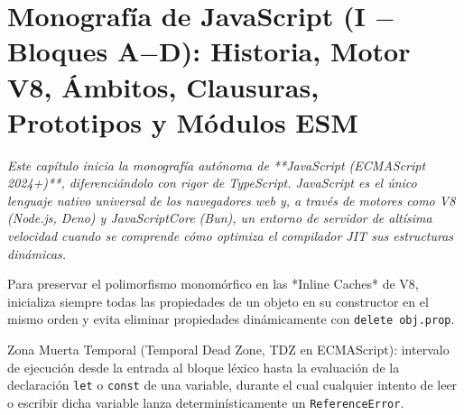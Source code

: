 \documentclass{book}
\begin{document}
\chapter{Monografía de JavaScript (I \(-\) Bloques A\(-\)D): Historia, Motor V8, Ámbitos, Clausuras, Prototipos y Módulos ESM}
\label{chap:cap04-javascript-fundamentos-closures-prototipos-nivel-intermedio}

\noindent\textit{Este capítulo inicia la monografía autónoma de **JavaScript (ECMAScript 2024+)**, diferenciándolo con rigor de TypeScript. JavaScript es el único lenguaje nativo universal de los navegadores web y, a través de motores como V8 (Node.js, Deno) y JavaScriptCore (Bun), un entorno de servidor de altísima velocidad cuando se comprende cómo optimiza el compilador JIT sus estructuras dinámicas.}

\begin{tcolorbox}[title={Consejo}, studiumtip, breakable]

Para preservar el polimorfismo monomórfico en las *Inline Caches* de V8, inicializa siempre todas las propiedades de un objeto en su constructor en el mismo orden y evita eliminar propiedades dinámicamente con \texttt{delete obj.prop}.
\end{tcolorbox}

\begin{tcolorbox}[title={Definición}, studiumdef, breakable]

Zona Muerta Temporal (Temporal Dead Zone, TDZ en ECMAScript): intervalo de ejecución desde la entrada al bloque léxico hasta la evaluación de la declaración \texttt{let} o \texttt{const} de una variable, durante el cual cualquier intento de leer o escribir dicha variable lanza determinísticamente un \texttt{ReferenceError}.
\end{tcolorbox}
\end{document}
